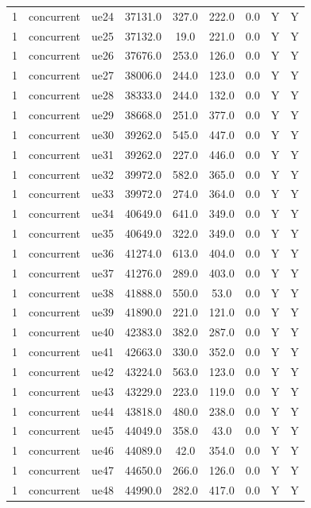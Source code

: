 \begin{table}[ht]
\begin{tabular}{|c|c|c|c|c|c|c|c|c|}
1 & concurrent & ue24 & 37131.0 & 327.0 & 222.0 & 0.0 & Y & Y \\
1 & concurrent & ue25 & 37132.0 & 19.0 & 221.0 & 0.0 & Y & Y \\
1 & concurrent & ue26 & 37676.0 & 253.0 & 126.0 & 0.0 & Y & Y \\
1 & concurrent & ue27 & 38006.0 & 244.0 & 123.0 & 0.0 & Y & Y \\
1 & concurrent & ue28 & 38333.0 & 244.0 & 132.0 & 0.0 & Y & Y \\
1 & concurrent & ue29 & 38668.0 & 251.0 & 377.0 & 0.0 & Y & Y \\
1 & concurrent & ue30 & 39262.0 & 545.0 & 447.0 & 0.0 & Y & Y \\
1 & concurrent & ue31 & 39262.0 & 227.0 & 446.0 & 0.0 & Y & Y \\
1 & concurrent & ue32 & 39972.0 & 582.0 & 365.0 & 0.0 & Y & Y \\
1 & concurrent & ue33 & 39972.0 & 274.0 & 364.0 & 0.0 & Y & Y \\
1 & concurrent & ue34 & 40649.0 & 641.0 & 349.0 & 0.0 & Y & Y \\
1 & concurrent & ue35 & 40649.0 & 322.0 & 349.0 & 0.0 & Y & Y \\
1 & concurrent & ue36 & 41274.0 & 613.0 & 404.0 & 0.0 & Y & Y \\
1 & concurrent & ue37 & 41276.0 & 289.0 & 403.0 & 0.0 & Y & Y \\
1 & concurrent & ue38 & 41888.0 & 550.0 & 53.0 & 0.0 & Y & Y \\
1 & concurrent & ue39 & 41890.0 & 221.0 & 121.0 & 0.0 & Y & Y \\
1 & concurrent & ue40 & 42383.0 & 382.0 & 287.0 & 0.0 & Y & Y \\
1 & concurrent & ue41 & 42663.0 & 330.0 & 352.0 & 0.0 & Y & Y \\
1 & concurrent & ue42 & 43224.0 & 563.0 & 123.0 & 0.0 & Y & Y \\
1 & concurrent & ue43 & 43229.0 & 223.0 & 119.0 & 0.0 & Y & Y \\
1 & concurrent & ue44 & 43818.0 & 480.0 & 238.0 & 0.0 & Y & Y \\
1 & concurrent & ue45 & 44049.0 & 358.0 & 43.0 & 0.0 & Y & Y \\
1 & concurrent & ue46 & 44089.0 & 42.0 & 354.0 & 0.0 & Y & Y \\
1 & concurrent & ue47 & 44650.0 & 266.0 & 126.0 & 0.0 & Y & Y \\
1 & concurrent & ue48 & 44990.0 & 282.0 & 417.0 & 0.0 & Y & Y \\

\end{tabular}
\end{table}
